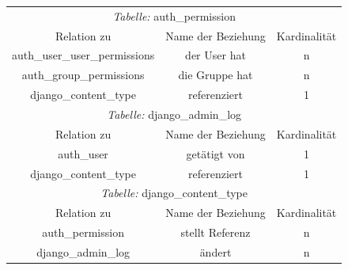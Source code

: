 \begin{longtable}{@{}ccc@{}}
  \toprule
  \multicolumn{3}{c}{\emph{Tabelle:} auth\_permission} \\
  Relation zu & Name der Beziehung & Kardinalität \\
  \cmidrule(lr){1-1}\cmidrule(lr){2-2}\cmidrule(lr){3-3}
  auth\_user\_user\_permissions & der User hat  & n \\
  auth\_group\_permissions & die Gruppe hat & n \\
  django\_content\_type & referenziert & 1 \\

  \toprule
  \multicolumn{3}{c}{\emph{Tabelle:} django\_admin\_log} \\
  Relation zu & Name der Beziehung & Kardinalität \\
  \cmidrule(lr){1-1}\cmidrule(lr){2-2}\cmidrule(lr){3-3}
  auth\_user & getätigt von  & 1 \\
  django\_content\_type & referenziert & 1 \\

  \toprule
  \multicolumn{3}{c}{\emph{Tabelle:} django\_content\_type} \\
  Relation zu & Name der Beziehung & Kardinalität \\
  \cmidrule(lr){1-1}\cmidrule(lr){2-2}\cmidrule(lr){3-3}
  auth\_permission & stellt Referenz  & n \\
  django\_admin\_log & ändert & n \\
\end{longtable}
